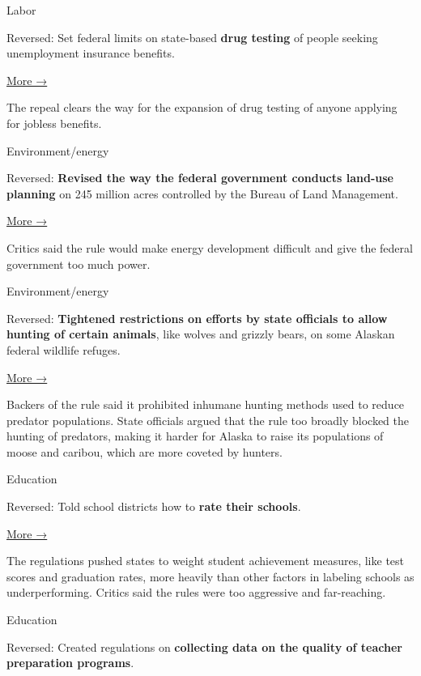 Labor

Reversed: Set federal limits on state-based \textbf{drug testing} of
people seeking unemployment insurance benefits.

\href{https://www.whitehouse.gov/the-press-office/2017/02/07/hjr-42-disapproving-rule-submitted-department-labor-relating-drug}{More
→}

The repeal clears the way for the expansion of drug testing of anyone
applying for jobless benefits.

Environment/energy

Reversed: \textbf{Revised the way the federal government conducts
land-use planning} on 245 million acres controlled by the Bureau of Land
Management.

\href{https://www.whitehouse.gov/the-press-office/2017/02/07/hjr-44-disapproving-rule-submitted-department-interior-relating-bureau}{More
→}

Critics said the rule would make energy development difficult and give
the federal government too much power.

Environment/energy

Reversed: \textbf{Tightened restrictions on efforts by state officials
to allow hunting of certain animals}, like wolves and grizzly bears,​ on
some Alaskan federal wildlife refuges.

\href{https://www.adn.com/alaska-news/wildlife/2017/04/10/congress-and-trump-revoked-the-predator-control-ban-on-alaskas-refuges-now-what/}{More
→}

Backers of the rule said it prohibited inhumane hunting methods used to
reduce predator populations.​ State officials argued that the rule too
broadly blocked the hunting of predators, making it harder for Alaska to
raise its populations of moose and caribou, which are more coveted by
hunters.

Education

Reversed: Told school districts how to \textbf{rate their schools}.

\href{https://www.nytimes3xbfgragh.onion/2017/03/09/us/every-student-succeeds-act-essa-congress.html}{More
→}

The regulations pushed states to weight student achievement measures,
like test scores and graduation rates, more heavily than other factors
in labeling schools as underperforming.​ Critics said the rules were too
aggressive and far-reaching.

Education

Reversed: Created regulations on \textbf{collecting data on the quality
of teacher preparation programs}.


